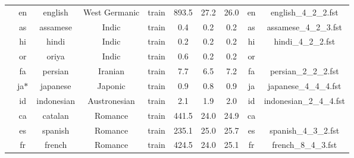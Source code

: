 \begin{table}[h!]
\begin{center}
\begin{tabular}{@{}cccccccccc@{}}
                                  & en                             & english                        & West Germanic    &train                & 893.5      & 27.2       & 26.0     & en        & english\_4\_2\_2.fst        \\
                                  & as                             & assamese                       & Indic           &train                 & 0.4        & 0.2        & 0.2      & as        & assamese\_4\_2\_3.fst       \\
                                  & hi                             & hindi                          & Indic           &train                 & 0.2        & 0.2        & 0.2      & hi        & hindi\_4\_2\_2.fst          \\
                                  & or                             & oriya                          & Indic           &train                 & 0.6        & 0.2        & 0.2      & or        &                             \\
                                  & fa                             & persian                        & Iranian         &train                 & 7.7        & 6.5        & 7.2      & fa        & persian\_2\_2\_2.fst        \\
                                  & ja$*$                             & japanese                       & Japonic      &train                    & 0.9        & 0.8        & 0.9      & ja        & japanese\_4\_4\_4.fst       \\
                                  & id                             & indonesian                     & Austronesian    &train                 & 2.1        & 1.9        & 2.0      & id        & indonesian\_2\_4\_4.fst     \\
                                  & ca                             & catalan                        & Romance        &train                  & 441.5      & 24.0       & 24.9     & ca        &                             \\
                                  & es                             & spanish                        & Romance        &train                  & 235.1      & 25.0       & 25.7     & es        & spanish\_4\_3\_2.fst        \\
                                  & fr                             & french                         & Romance        &train                  & 424.5      & 24.0       & 25.1     & fr        & french\_8\_4\_3.fst         \\

\end{tabular}
\end{center}
\end{table}
